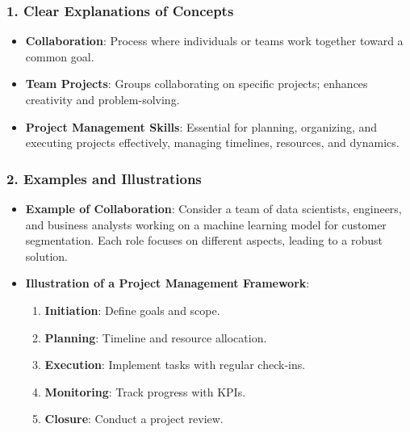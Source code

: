 \documentclass[aspectratio=169]{beamer}
\begin{document}
\begin{frame}[fragile]
    \frametitle{1. Clear Explanations of Concepts}
    \begin{itemize}
        \item \textbf{Collaboration}: Process where individuals or teams work together toward a common goal.
        \item \textbf{Team Projects}: Groups collaborating on specific projects; enhances creativity and problem-solving.
        \item \textbf{Project Management Skills}: Essential for planning, organizing, and executing projects effectively, managing timelines, resources, and dynamics.
    \end{itemize}
\end{frame}

\begin{frame}[fragile]
    \frametitle{2. Examples and Illustrations}
    \begin{itemize}
        \item \textbf{Example of Collaboration}: 
        Consider a team of data scientists, engineers, and business analysts working on a machine learning model for customer segmentation. 
        Each role focuses on different aspects, leading to a robust solution.

        \item \textbf{Illustration of a Project Management Framework}:
        \begin{enumerate}
            \item \textbf{Initiation}: Define goals and scope.
            \item \textbf{Planning}: Timeline and resource allocation.
            \item \textbf{Execution}: Implement tasks with regular check-ins.
            \item \textbf{Monitoring}: Track progress with KPIs.
            \item \textbf{Closure}: Conduct a project review.
        \end{enumerate}
    \end{itemize}
\end{frame}
\end{document}
